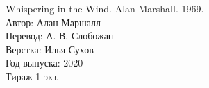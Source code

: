 \mbox{}
\vfill
\begin{center}
Whispering in the Wind. Alan Marshall. 1969.\\
Автор: Алан Маршалл\\
Перевод: А. В. Слобожан\\
Верстка: Илья Сухов\\
Год выпуска: 2020\\
Тираж 1 экз.
\end{center}

